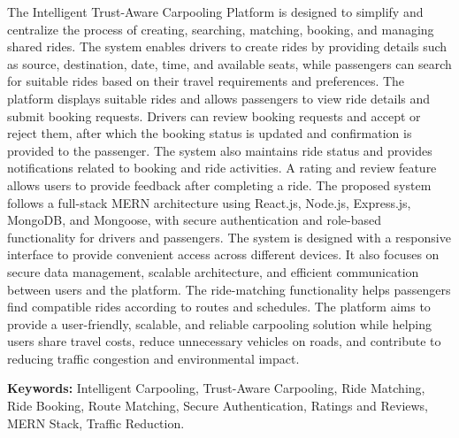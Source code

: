 \documentclass[12pt,a4paper,oneside]{report}
\newcommand{\frontheading}[1]{%
  \begin{center}\vspace*{0.2cm}{\Large\bfseries #1}\end{center}\vspace{0.8cm}}
\begin{document}
\clearpage
\frontheading{Abstract}
\justifying
The Intelligent Trust-Aware Carpooling Platform is designed to simplify and
centralize the process of creating, searching, matching, booking, and managing
shared rides. The system enables drivers to create rides by providing details
such as source, destination, date, time, and available seats, while passengers
can search for suitable rides based on their travel requirements and
preferences. The platform displays suitable rides and allows passengers to
view ride details and submit booking requests. Drivers can review booking
requests and accept or reject them, after which the booking status is updated
and confirmation is provided to the passenger. The system also maintains ride
status and provides notifications related to booking and ride activities. A
rating and review feature allows users to provide feedback after completing a
ride. 
\vspace{0pt}
The proposed system follows a full-stack MERN architecture using React.js,
Node.js, Express.js, MongoDB, and Mongoose, with secure authentication and
role-based functionality for drivers and passengers. The system is designed
with a responsive interface to provide convenient access across different
devices. It also focuses on secure data management, scalable architecture, and
efficient communication between users and the platform. The ride-matching
functionality helps passengers find compatible rides according to routes and
schedules. The platform aims to provide a user-friendly, scalable, and reliable
carpooling solution while helping users share travel costs, reduce unnecessary
vehicles on roads, and contribute to reducing traffic congestion and
environmental impact.

\vfill
\setlength{\parindent}{0pt}
\textbf{Keywords:} Intelligent Carpooling, Trust-Aware Carpooling, Ride
Matching, Ride Booking, Route Matching, Secure Authentication, Ratings and
Reviews, MERN Stack, Traffic Reduction.
\end{document}
